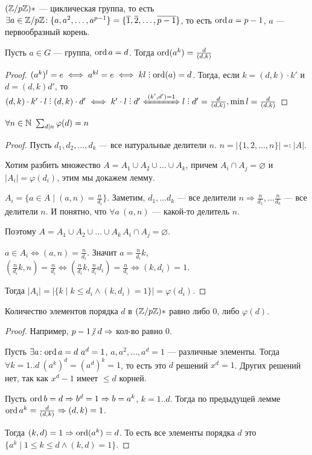 \begin{theorem}
    $(\mathbb{Z} / p \mathbb{Z})*$ --- циклическая группа, то  есть  $\exists a \in \mathbb{Z} / p \mathbb{Z}\!: \{a, a^2,\ldots,a^{p-1}\} = \{\overline{1}, \overline{2},\ldots, \overline{p-1}\}$, то есть $\operatorname{ord} a = p - 1$,  $a$ --- первообразный корень.
\end{theorem}
\begin{lemma}
    Пусть $a \in G$ --- группа,  $\operatorname{ord} a = d$. Тогда  $\operatorname{ord}(a^k) = \frac{d}{(d, k)}$
\end{lemma}
\begin{proof}
	$(a^k)^l = e \iff a^{kl} = e \iff kl \divby \ord(a) = d$. Тогда, если $k = (d, k) \cdot k'$  и  $d = (d, k) d'$, то  $(d, k) \cdot k' \cdot l \divby (d, k) \cdot d' \iff k' \cdot l \divby d' \xLeftrightarrow{(k', d') = 1} l \divby d' = \frac{d}{(d, k)}, \min l = \frac{d}{(d, k)}$ 
\end{proof}
\begin{lemma}
    $\forall n \in \mathbb{N}\ \sum_{d \mid n} \varphi(d) = n$
\end{lemma}
\begin{proof}
    Пусть $d_1, d_2, \ldots, d_k$ --- все натуральные делители $n$.  $n = |\{1, 2, \ldots, n\}| \eqqcolon |A|$.

    Хотим разбить множество $A = A_1 \cup A_2 \cup \ldots \cup A_k$, причем $A_i \cap A_j = \varnothing$ и  $|A_i| = \varphi(d_i)$, этим мы докажем лемму.

    $A_i = \{ a \in A \mid (a, n) = \frac{n}{d_i}\}$. Заметим, $d_1, \ldots d_k$ --- все делители $n \Rightarrow \frac{n}{d_1}, \ldots \frac{n}{d_k}$ --- все делители $n$. И понятно, что  $\forall a\ (a, n)$ --- какой-то делитель  $n$. 

     Поэтому $A = A_1 \cup A_2 \cup \ldots \cup A_k\, A_i \cap A_j = \varnothing$.

     $a \in A_i \iff (a, n) = \frac{n}{d_i}$. Значит $a = \frac{n}{d_i}k$, $(\frac{n}{d_i}k, n) = \frac{n}{d_i} \iff (\frac{n}{d_i}k, \frac{n}{d_i}d_i) = \frac{n}{d_i} \iff (k, d_i) = 1$. 

     Тогда $|A_i| = |\{ k \mid k \le d_i \land (k, d_i) = 1\}| = \varphi(d_i)$.
\end{proof}
\begin{lemma}
    Количество элементов порядка $d$ в  $(\mathbb{Z} / p \mathbb{Z})*$ равно либо 0, либо  $\varphi(d)$. 
\end{lemma}
\begin{proof}
    Например, $p-1 \centernot \divby d \Rightarrow $ кол-во равно  $0$. 

    Пусть  $\exists a\!: \operatorname{ord} a = d\ a^d = 1$, $a, a^2, \ldots, a^d = 1$ --- различные элементы. Тогда $\forall k=1..d\ (a^k)^d = (a^d)^k = 1$, то есть это  $d$ решений  $x^d = 1$. Других решений нет, так как  $x^d - 1$ имеет  $\le d$ корней.

    Пусть $\operatorname{ord} b = d \Rightarrow b^d = 1 \Rightarrow b = a^k$,  $k = 1..d$. Тогда по предыдущей лемме  $\operatorname{ord} a^k = \frac{d}{(d, k)} \Rightarrow (d, k) = 1$. 

    Тогда $(k, d)= 1 \Rightarrow \operatorname{ord}(a^k) = d$. То есть все элементы порядка  $d$ это  $\{a^k \mid 1 \le k \le d \land (k, d) = 1 \}$.
\end{proof}

